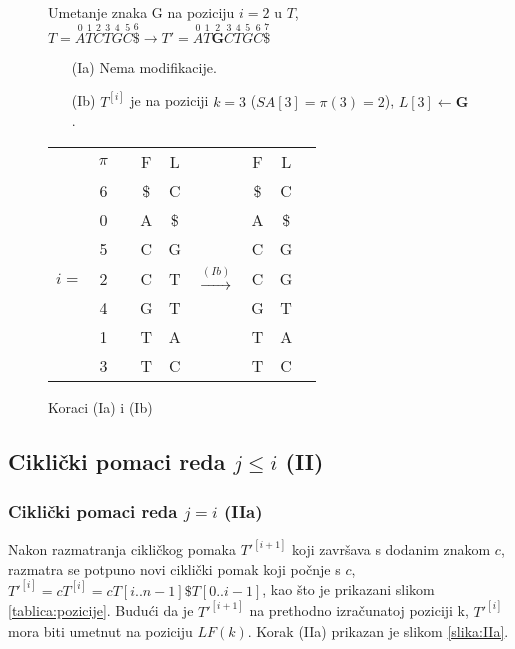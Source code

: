 \documentclass{ferseminar}
\begin{document}
\begin{figure}[H]


\begin{minipage}{0.5\textwidth}
\footnotesize
Umetanje znaka G na poziciju $i=2$ u $T$, 
$
	T=\overset{0}{A}	\overset{1}{T} \overset{2}{C} \overset{3}{T}	\overset{4}{G}
	\overset{5}{C}	\overset{6}{\$} \rightarrow		
	T'=\overset{0}{A}	\overset{1}{T}	\overset{2}{\boldsymbol{G}}  \overset{3}{C} \overset{4}{T}	\overset{5}{G}
	\overset{6}{C}	\overset{7}{\$} 	
$
\begin{itemize}
  \item[(Ia)] Nema modifikacije.
  \item[(Ib)] $T^{[i]}$ je na poziciji $k=3$ ($SA[3]=\pi(3)=2$), $L[3]\leftarrow \boldsymbol{G}$.
\end{itemize}
\end{minipage} \hfill
\begin{minipage}{0.45\textwidth}
\begin{tabular}{cccc|ccc|cc}
	& $\pi$ &  & F & L & & F & L \\
	\cline{2-2} \cline{4-5} \cline{7-8}
	& 6 & & \$ & C & & \$ & C \\
	& 0 & & A & \$ & & A & \$ \\
	& 5 & & C & G & & C & G \\
	\cline{1-8}
	\multicolumn{1}{|c}{$i=$}& 2 & & C & T & $\stackrel{(Ib)}{\longrightarrow}$ & C & \multicolumn{1}{c|}{G} \\
	\cline{1-8}
	& 4 & & G & T & & G & T \\
	& 1 & & T & A & & T & A \\
	& 3 & & T & C & & T & C 
\end{tabular}

\end{minipage}
\caption{Koraci (Ia) i (Ib)}
\label{slika:Ia}
\end{figure}

\subsection{Ciklički pomaci reda $j\leq i$ (II)}
\subsubsection{Ciklički pomaci reda $j=i$ (IIa)}
Nakon razmatranja cikličkog pomaka $T'^{[i+1]}$ koji završava s dodanim znakom $c$, razmatra se potpuno novi ciklički pomak koji počnje s $c$, $T'^{[i]}=cT^{[i]}=cT[i..n-1]\$T[0..i-1]$, kao što je prikazani slikom \ref{tablica:pozicije}. Budući da je $T'^{[i+1]}$ na prethodno izračunatoj poziciji k, $T'^{[i]}$ mora biti umetnut na poziciju $LF(k)$. Korak (IIa) prikazan je slikom \ref{slika:IIa}. 
\end{document}
